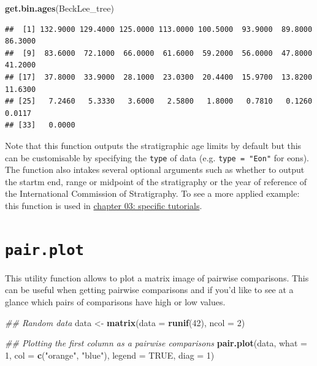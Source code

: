 \documentclass[]{book}
\newenvironment{Shaded}{\begin{snugshade}}{\end{snugshade}}
\newcommand{\CommentTok}[1]{\textcolor[rgb]{0.56,0.35,0.01}{\textit{#1}}}
\newcommand{\DataTypeTok}[1]{\textcolor[rgb]{0.13,0.29,0.53}{#1}}
\newcommand{\DecValTok}[1]{\textcolor[rgb]{0.00,0.00,0.81}{#1}}
\newcommand{\KeywordTok}[1]{\textcolor[rgb]{0.13,0.29,0.53}{\textbf{#1}}}
\newcommand{\NormalTok}[1]{#1}
\newcommand{\OtherTok}[1]{\textcolor[rgb]{0.56,0.35,0.01}{#1}}
\newcommand{\StringTok}[1]{\textcolor[rgb]{0.31,0.60,0.02}{#1}}
\begin{document}
\begin{Shaded}
\begin{Highlighting}[]
\KeywordTok{get.bin.ages}\NormalTok{(BeckLee_tree)}
\end{Highlighting}
\end{Shaded}

\begin{verbatim}
##  [1] 132.9000 129.4000 125.0000 113.0000 100.5000  93.9000  89.8000  86.3000
##  [9]  83.6000  72.1000  66.0000  61.6000  59.2000  56.0000  47.8000  41.2000
## [17]  37.8000  33.9000  28.1000  23.0300  20.4400  15.9700  13.8200  11.6300
## [25]   7.2460   5.3330   3.6000   2.5800   1.8000   0.7810   0.1260   0.0117
## [33]   0.0000
\end{verbatim}

Note that this function outputs the stratigraphic age limits by default but this can be customisable by specifying the \texttt{type} of data (e.g. \texttt{type\ =\ "Eon"} for eons).
The function also intakes several optional arguments such as whether to output the startm end, range or midpoint of the stratigraphy or the year of reference of the International Commission of Stratigraphy.
To see a more applied example: this function is used in \protect\hyperlink{chrono-subsets}{chapter 03: specific tutorials}.

\hypertarget{pair.plot}{%
\section{\texorpdfstring{\texttt{pair.plot}}{pair.plot}}\label{pair.plot}}

This utility function allows to plot a matrix image of pairwise comparisons.
This can be useful when getting pairwise comparisons and if you'd like to see at a glance which pairs of comparisons have high or low values.

\begin{Shaded}
\begin{Highlighting}[]
\CommentTok{## Random data}
\NormalTok{data <-}\StringTok{ }\KeywordTok{matrix}\NormalTok{(}\DataTypeTok{data =} \KeywordTok{runif}\NormalTok{(}\DecValTok{42}\NormalTok{), }\DataTypeTok{ncol =} \DecValTok{2}\NormalTok{)}

\CommentTok{## Plotting the first column as a pairwise comparisons}
\KeywordTok{pair.plot}\NormalTok{(data, }\DataTypeTok{what =} \DecValTok{1}\NormalTok{, }\DataTypeTok{col =} \KeywordTok{c}\NormalTok{(}\StringTok{"orange"}\NormalTok{, }\StringTok{"blue"}\NormalTok{), }\DataTypeTok{legend =} \OtherTok{TRUE}\NormalTok{, }\DataTypeTok{diag =} \DecValTok{1}\NormalTok{)}
\end{Highlighting}
\end{Shaded}
\end{document}
